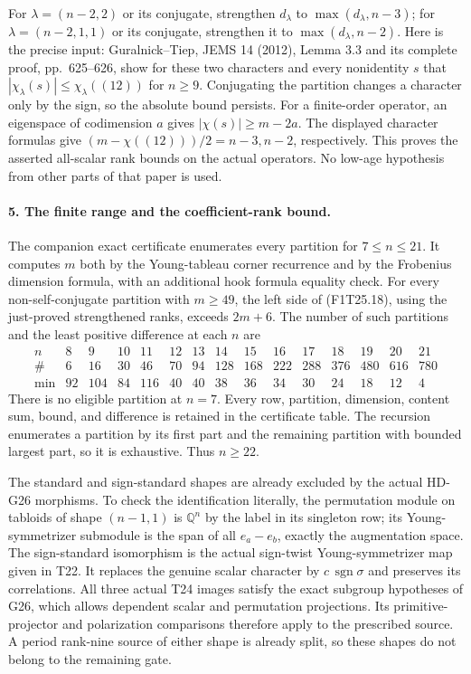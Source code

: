 For $\lambda=(n-2,2)$ or its conjugate, strengthen
$d_\lambda$ to $\max(d_\lambda,n-3)$; for
$\lambda=(n-2,1,1)$ or its conjugate, strengthen it
to $\max(d_\lambda,n-2)$. Here is the precise input:
Guralnick--Tiep, JEMS 14 (2012), Lemma 3.3 and its
complete proof, pp.~625--626, show for these two
characters and every nonidentity $s$ that
$|\chi_\lambda(s)|\le\chi_\lambda((12))$ for
$n\ge9$. Conjugating the partition changes a character
only by the sign, so the absolute bound persists.
For a finite-order operator, an eigenspace of
codimension $a$ gives $|\chi(s)|\ge m-2a$.
The displayed character formulas give
$(m-\chi((12)))/2=n-3,n-2$, respectively. This proves
the asserted all-scalar rank bounds on the actual
operators. No low-age hypothesis from other parts of
that paper is used.

\paragraph{5. The finite range and the coefficient-rank bound.}
The companion exact certificate enumerates every
partition for $7\le n\le21$. It computes $m$ both
by the Young-tableau corner recurrence and by the
Frobenius dimension formula, with an additional hook
formula equality check. For every non-self-conjugate
partition with $m\ge49$, the left side of
(F1T25.18), using the just-proved strengthened ranks,
exceeds $2m+6$. The number of such partitions and the
least positive difference at each $n$ are
\[
\begin{array}{c|rrrrrrrrrrrrrr}
n&8&9&10&11&12&13&14&15&16&17&18&19&20&21\\ \hline
\#&6&16&30&46&70&94&128&168&222&288&376&480&616&780\\
\min&92&104&84&116&40&40&38&36&34&30&24&18&12&4
\end{array}
\tag{F1T25.19}
\]
There is no eligible partition at $n=7$. Every row,
partition, dimension, content sum, bound, and difference
is retained in the certificate table. The recursion
enumerates a partition by its first part and the
remaining partition with bounded largest part, so it
is exhaustive. Thus $n\ge22$.

The standard and sign-standard shapes are already
excluded by the actual HD-G26 morphisms. To check the
identification literally, the permutation module on
tabloids of shape $(n-1,1)$ is $\mathbb Q^n$ by the
label in its singleton row; its Young-symmetrizer
submodule is the span of all $e_a-e_b$, exactly the
augmentation space. The sign-standard isomorphism is
the actual sign-twist Young-symmetrizer map given in
T22. It replaces the genuine scalar character by
$c\,\operatorname{sgn}\sigma$ and preserves its
correlations. All three actual T24 images satisfy
the exact subgroup hypotheses of G26, which allows
dependent scalar and permutation projections.
Its primitive-projector and polarization comparisons
therefore apply to the prescribed source. A period
rank-nine source of either shape is already split,
so these shapes do not belong to the remaining gate.


